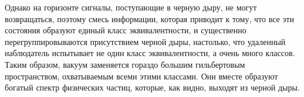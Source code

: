 \documentclass[main.tex]{subfiles}
\begin{document}
Однако на горизонте сигналы, поступающие в черную дыру, не могут возвращаться, поэтому смесь информации, которая приводит к тому, что все эти состояния образуют единый класс эквивалентности, и существенно перегруппировываются присутствием черной дыры, настолько, что удаленный наблюдатель испытывает не один класс эквивалентности, а очень много классов. Таким образом, вакуум заменяется гораздо большим гильбертовым пространством, охватываемым всеми этими классами. Они вместе образуют богатый спектр физических частиц, которые, как видно, выходят из черной дыры.
\end{document}
